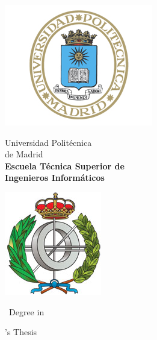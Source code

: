 \begin{titlepage}

\begin{minipage}{0.15\linewidth}
\hspace*{-15mm}
\noindent
\includegraphics[scale=0.5]{title_page/escudo_upm.png}
\end{minipage}
\begin{minipage}{0.7\linewidth}
\begin{center}
\huge{ Universidad Politécnica\\de Madrid }\\
\vspace*{0.5cm}
\Large{\textbf{Escuela Técnica Superior de \\
Ingenieros Informáticos}}
\end{center}
\end{minipage}
\begin{minipage}{0.2\linewidth}
\includegraphics[scale=0.5]{title_page/escudo_etsiinf.png}
\end{minipage}

\vspace*{1cm}
\begin{center}
\Large{\Estudios\ Degree in \TituloEstudios}
\end{center}

\vspace*{1cm}
\begin{center}
\huge{\Estudios's Thesis}
\end{center}

\vspace*{0.5cm}
\begin{center}
\huge\bfseries {\TituloTFM}
\end{center}


\end{titlepage}
